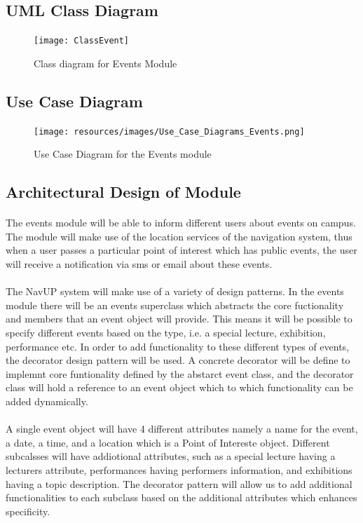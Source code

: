 \documentclass{article}
\begin{document}
\subsection{UML Class Diagram}

\begin{figure}[H]
\centering
\texttt{[image: ClassEvent]}
\caption{Class diagram for Events Module}
\end{figure}

\subsection {Use Case Diagram}

\begin{figure}[H]
\centering
\texttt{[image: resources/images/Use\_Case\_Diagrams\_Events.png]}
\caption{Use Case Diagram for the Events module}
\end{figure}

\subsection{Architectural Design of Module}
\paragraph{}The events module will be able to inform different users about events on campus. The module will make use of the location services of the navigation system, thus when a user passes a particular point of interest which has public events, the user will receive a notification via sms or email about these events. 

\paragraph{} The NavUP system will make use of a variety of design patterns. In the events module there will be an events superclass which abstracts the core fuctionality and members that an event object will provide. This means it will be possible to specify different events based on the type, i.e. a special lecture, exhibition, performance etc. In order to add functionality to these different types of events, the decorator design pattern will be used. A concrete decorator will be define to implemnt core funtionality defined by the abstarct event class, and the decorator class will hold a reference to an event object which to which functionality can be added dynamically.

\paragraph{} A single event object will have 4 different attributes namely a name for the event, a date, a time, and a location which is a Point of Intereste object. Different subcalsses will have addiotional attributes, such as a special lecture having a lecturers attribute, performances having performers information, and exhibitions having a topic description. The decorator pattern will allow us to add additional functionalities to each subclass based on the additional attributes which enhances specificity. 
\end{document}
